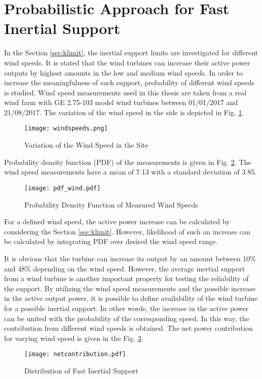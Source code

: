 \section{Probabilistic Approach for Fast Inertial Support}
In the Section \ref{sec:klimit}, the inertial support limits are investigated for different wind speeds. It is stated that the wind turbines can increase their active power outputs by highest amounts in the low and medium wind speeds. In order to increase the meaningfulness of such support, probability of different wind speeds is studied. Wind speed measurements used in this thesis are taken from a real wind farm with GE 2.75-103 model wind turbines between 01/01/2017 and 21/08/2017. The variation of the wind speed in the side is depicted in Fig. \ref{windvariation}.\par
\begin{figure}[h!]
	\centering
	\texttt{[image: windspeeds.png]}
	\caption{Variation of the Wind Speed in the Site}
	\label{windvariation}
\end{figure}
Probability density function (PDF) of the measurements is given in Fig. \ref{windpdf}. The wind speed measurements have a mean of 7.13 with a standard deviation of 3.85.\par
\begin{figure}[h!]
	\centering
	\texttt{[image: pdf\_wind.pdf]}
	\caption{Probability Density Function of Measured Wind Speeds}
	\label{windpdf}
\end{figure}
For a defined wind speed, the active power increase can be calculated by considering the Section \ref{sec:klimit}. However, likelihood of such an increase can be calculated by integrating PDF over desired the wind speed range.\par
It is obvious that the turbine can increase its output by an amount between 10\% and 48\% depending on the wind speed. However, the average inertial support from a wind turbine is another important property for testing the reliability of the support. By utilizing the wind speed measurements and the possible increase in the active output power, it is possible to define availability of the wind turbine for a possible inertial support. In other words, the increase in the active power can be united with the probability of the corresponding speed. In this way, the contribution from different wind speeds is obtained. The net power contribution for varying wind speed is given in the Fig. \ref{net_contribution}.\par
\begin{figure}[h!]
	\centering
	\texttt{[image: netcontribution.pdf]}
	\caption{Distribution of Fast Inertial Support}
	\label{net_contribution}
\end{figure}
